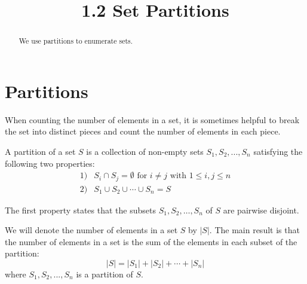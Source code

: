 \documentclass[handout]{ximera}
\title{1.2 Set Partitions}
\begin{document}
\begin{abstract}
We use partitions to enumerate sets.
\end{abstract}

\maketitle

\section{Partitions}

When counting the number of elements in a set, it is sometimes helpful to break the set into
distinct pieces and count the number of elements in each piece. 

\begin{definition}[Partition]
A partition of a set $S$ is a collection of non-empty sets $S_1, S_2, ..., S_n$ satisfying the 
following two properties:
\begin{align*}
1) & S_i \cap S_j = \emptyset \text{ for } i \neq j \text{ with } 1 \leq i,j \leq n\\
2) & S_1 \cup S_2 \cup \cdots \cup S_n = S
\end{align*}
\end{definition}

\begin{image}
\end{image}
\begin{remark}
The first property states that the subsets $S_1, S_2, \dots, S_n$ of $S$ are pairwise disjoint.
\end{remark}

We will denote the number of elements in a set $S$ by $|S|$. The main result
 is that the number of elements in a set is the sum of the elements in each 
subset of the partition:
\[
|S| = |S_1| + |S_2|+ \cdots + |S_n|
\]
where $S_1, S_2, ..., S_n$ is a partition of $S$.
\end{document}

